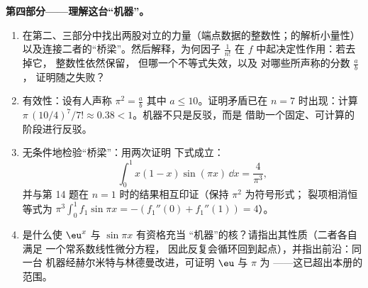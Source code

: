 \begin{problem}
\medskip
\noindent\textbf{第四部分——理解这台“机器”。}
\begin{enumerate}[resume]
  \item 在第二、三部分中找出两股对立的力量（端点数据的整数性；的解析小量性）
        以及连接二者的“桥梁”。然后解释，为何因子
        $\frac{1}{n!}$ 在 $f$ 中起决定性作用：若去掉它，
        整数性依然保留，
        但哪一个不等式失效，以及
        对哪些所声称的分数 $\frac ab$，
        证明随之失败？
  \item 有效性：设有人声称 $\pi^2 = \frac ab$
        其中 $a \leq 10$。证明矛盾已在
        $n = 7$ 时出现：计算 $\pi\,(10/4)^7/7! \approx
        0.38 < 1$。机器不只是反驳，而是
        借助一个固定、可计算的阶段进行反驳。
  \item 无条件地检验“桥梁”：用两次证明
        下式成立：
        \[
        \int_0^1 x(1 - x)\sin(\pi x)\,\dd x = \frac{4}{\pi^3},
        \]
        并与第 14 题在 $n = 1$ 时的结果相互印证（保持 $\pi^2$ 为符号形式；
        裂项相消恒等式为 $\pi^3
        \int_0^1 f_1 \sin \pi x = -(f_1''(0) + f_1''(1)) = 4$）。
  \item 是什么使 $\eu^x$ 与 $\sin \pi x$ 有资格充当
        “机器”的核？请指出其性质（二者各自满足
        一个常系数线性微分方程，
        因此反复会循环回到起点），并指出前沿：同一台
        机器经赫尔米特与林德曼改进，可证明
        $\eu$ 与 $\pi$ 为\emph{}
——这已超出本册的范围。
\end{enumerate}


\end{problem}
